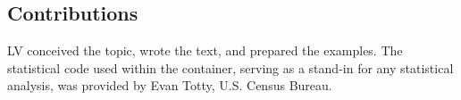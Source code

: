 \documentclass[]{hdsr}
\begin{document}
\subsection*{Contributions}

LV conceived the topic, wrote the text, and prepared the examples. The statistical code used within the container, serving as a stand-in for any statistical analysis, was provided by Evan Totty, U.S. Census Bureau.  


\appendix




\printbibliography


\end{document}

